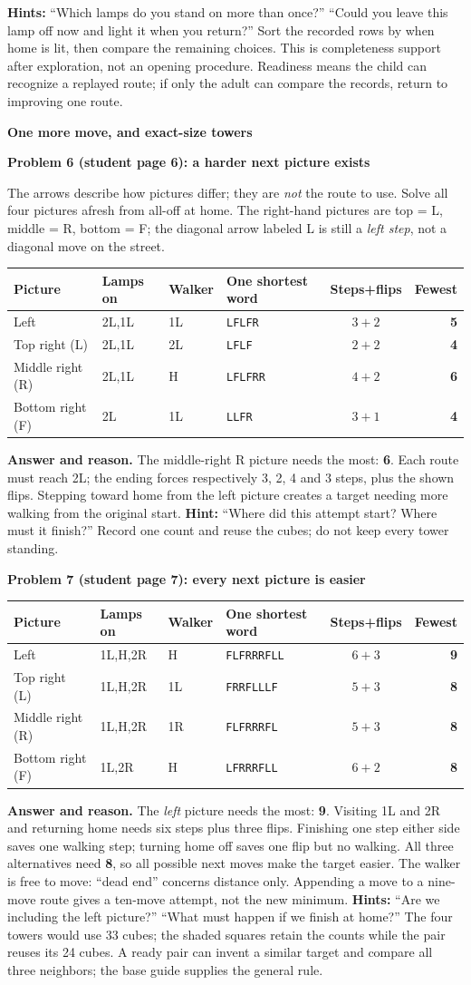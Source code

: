 \documentclass[11pt]{article}
\makeatletter
\newcommand{\head}[1]{\par\textbf{\large #1}\par}
\newcommand{\sub}[1]{\par\textbf{#1}\par}
\newcommand{\keyrow}[8]{#2 & #3 & #4 & \texttt{#5} & $#6+#7$ & \textbf{#8}\\}
\newenvironment{keytable}{\par\smallskip\begingroup\small\setlength{\tabcolsep}{7pt}\renewcommand{\arraystretch}{1.15}\begin{tabular}{@{}llllcr@{}}\textbf{Picture}&\textbf{Lamps on}&\textbf{Walker}&\textbf{One shortest word}&\textbf{Steps+flips}&\textbf{Fewest}\\\midrule}{\end{tabular}\endgroup\par\smallskip}
\makeatother
\begin{document}
\textbf{Hints:} ``Which lamps do you stand on more than once?'' ``Could you leave this lamp off now and light it when you return?'' Sort the recorded rows by when home is lit, then compare the remaining choices. This is completeness support after exploration, not an opening procedure. Readiness means the child can recognize a replayed route; if only the adult can compare the records, return to improving one route.
\newpage
\head{One more move, and exact-size towers}
\sub{Problem 6 (student page 6): a harder next picture exists}
The arrows describe how pictures differ; they are \emph{not} the route to use. Solve all four pictures afresh from all-off at home. The right-hand pictures are top = L, middle = R, bottom = F; the diagonal arrow labeled L is still a \emph{left step}, not a diagonal move on the street.
\begin{keytable}
\keyrow{6start}{Left}{2L,1L}{1L}{LFLFR}{3}{2}{5}
\keyrow{6L}{Top right (L)}{2L,1L}{2L}{LFLF}{2}{2}{4}
\keyrow{6R}{Middle right (R)}{2L,1L}{H}{LFLFRR}{4}{2}{6}
\keyrow{6F}{Bottom right (F)}{2L}{1L}{LLFR}{3}{1}{4}
\end{keytable}
\textbf{Answer and reason.} The middle-right R picture needs the most: \textbf{6}. Each route must reach 2L; the ending forces respectively 3, 2, 4 and 3 steps, plus the shown flips. Stepping toward home from the left picture creates a target needing more walking from the original start.
\textbf{Hint:} ``Where did this attempt start? Where must it finish?'' Record one count and reuse the cubes; do not keep every tower standing.

\sub{Problem 7 (student page 7): every next picture is easier}
\begin{keytable}
\keyrow{7start}{Left}{1L,H,2R}{H}{FLFRRRFLL}{6}{3}{9}
\keyrow{7L}{Top right (L)}{1L,H,2R}{1L}{FRRFLLLF}{5}{3}{8}
\keyrow{7R}{Middle right (R)}{1L,H,2R}{1R}{FLFRRRFL}{5}{3}{8}
\keyrow{7F}{Bottom right (F)}{1L,2R}{H}{LFRRRFLL}{6}{2}{8}
\end{keytable}
\textbf{Answer and reason.} The \emph{left} picture needs the most: \textbf{9}. Visiting 1L and 2R and returning home needs six steps plus three flips. Finishing one step either side saves one walking step; turning home off saves one flip but no walking. All three alternatives need \textbf{8}, so all possible next moves make the target easier. The walker is free to move: ``dead end'' concerns distance only. Appending a move to a nine-move route gives a ten-move attempt, not the new minimum.
\textbf{Hints:} ``Are we including the left picture?'' ``What must happen if we finish at home?'' The four towers would use 33 cubes; the shaded squares retain the counts while the pair reuses its 24 cubes. A ready pair can invent a similar target and compare all three neighbors; the base guide supplies the general rule.
\end{document}
